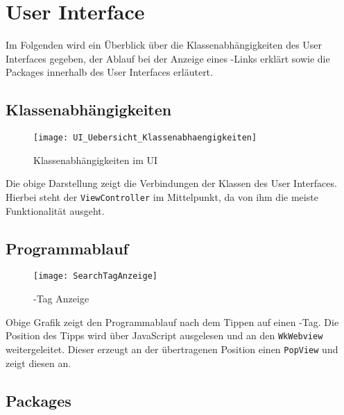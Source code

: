 
\chapter{User Interface}

Im Folgenden wird ein Überblick über die Klassenabhängigkeiten des User Interfaces gegeben, der Ablauf bei der Anzeige eines \SEARCH-Links erklärt sowie die Packages innerhalb des User Interfaces erläutert.
\section{Klassenabhängigkeiten}
\begin{figure}[h]
	\centering
	\texttt{[image: UI\_Uebersicht\_Klassenabhaengigkeiten]}
	\caption{Klassenabhängigkeiten im UI}
\end{figure}

Die obige Darstellung zeigt die Verbindungen der Klassen des User Interfaces. Hierbei steht der \lstinline|ViewController| im Mittelpunkt, da von ihm die meiste Funktionalität ausgeht.
\pagebreak
\section{Programmablauf}
\begin{figure}[ht]
	\centering
	\texttt{[image: SearchTagAnzeige]}
	\caption{\SEARCH-Tag Anzeige}
\end{figure}

Obige Grafik zeigt den Programmablauf nach dem Tippen auf einen \SEARCH-Tag. Die Position des Tipps wird über JavaScript ausgelesen und an den \lstinline|WkWebview| weitergeleitet. Dieser erzeugt an der übertragenen Position einen \lstinline|PopView| und zeigt diesen an. 
\section{Packages}

\newpage

\newpage

\newpage

\newpage

\newpage



